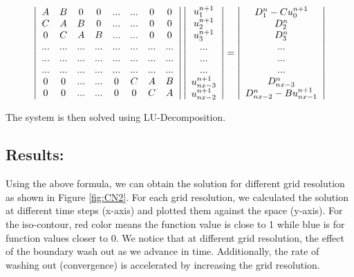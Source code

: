 \[
\left| \begin{array}{ccc ccccc}
A & B & 0 & 0 & ... & ... & 0 & 0 \\
C & A & B & 0 & ... & ... & 0 & 0 \\
0 & C & A & B & ... & ... & 0 & 0\\
... & ... & ... & ... & ... & ... & ... & ...\\
... & ... & ... & ... & ... & ... & ... & ...\\
... & ... & ... & ... & ... & ... & ... & ...\\
0 & 0 & ... & ... & 0 & C & A & B\\
0 & 0 & ... & ... & 0 & 0 & C & A\\
\end{array} \right|
\left| \begin{array}{c}
u_{1}^{n+1} \\
u_{2}^{n+1} \\
u_{3}^{n+1} \\
...\\
...\\
...\\
u_{nx-3}^{n+1}\\
u_{nx-2}^{n+1}\\
\end{array} \right|
=
\left| \begin{array}{c}
D_{1}^{n}-Cu_{0}^{n+1} \\
D_{2}^{n} \\
D_{3}^{n} \\
...\\
...\\
...\\
D_{nx-3}^{n} \\
D_{nx-2}^{n}-Bu_{nx-1}^{n+1} \\
\end{array} \right|
\] 

The system is then solved using LU-Decomposition. 
 
\subsection{Results:}
Using the above formula, we can obtain the solution for different grid resolution as shown in Figure \ref{fig:CN2}. For each grid resolution, we calculated the solution at different time steps (x-axis) and plotted them against the space (y-axis). For the iso-contour, red color means the function value is close to 1 while blue is for function values closer to 0. We notice that at different grid resolution, the effect of the boundary wash out as we advance in time. Additionally, the rate of washing out (convergence) is accelerated by increasing the grid resolution. 

